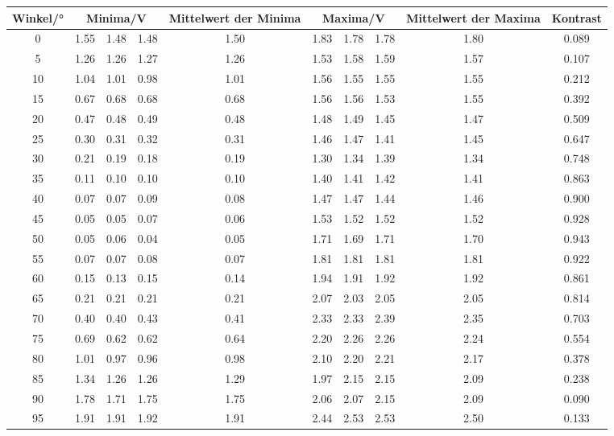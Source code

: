 \begin{sidewaystable}
\begin{tabular}{c c c c c c c c c c}
    \toprule
        Winkel/°&\multicolumn{3}{c}{Minima/V}&Mittelwert der Minima&\multicolumn{3}{c}{Maxima/V}&Mittelwert der Maxima&Kontrast \\
    \midrule
      0& 1.55 & 1.48 & 1.48 & 1.50 & 1.83 & 1.78 & 1.78 & 1.80 & 0.089 \\
      5& 1.26 & 1.26 & 1.27 & 1.26 & 1.53 & 1.58 & 1.59 & 1.57 & 0.107 \\
     10& 1.04 & 1.01 & 0.98 & 1.01 & 1.56 & 1.55 & 1.55 & 1.55 & 0.212 \\
     15& 0.67 & 0.68 & 0.68 & 0.68 & 1.56 & 1.56 & 1.53 & 1.55 & 0.392 \\
     20& 0.47 & 0.48 & 0.49 & 0.48 & 1.48 & 1.49 & 1.45 & 1.47 & 0.509 \\
     25& 0.30 & 0.31 & 0.32 & 0.31 & 1.46 & 1.47 & 1.41 & 1.45 & 0.647 \\
     30& 0.21 & 0.19 & 0.18 & 0.19 & 1.30 & 1.34 & 1.39 & 1.34 & 0.748 \\
     35& 0.11 & 0.10 & 0.10 & 0.10 & 1.40 & 1.41 & 1.42 & 1.41 & 0.863 \\
     40& 0.07 & 0.07 & 0.09 & 0.08 & 1.47 & 1.47 & 1.44 & 1.46 & 0.900 \\
     45& 0.05 & 0.05 & 0.07 & 0.06 & 1.53 & 1.52 & 1.52 & 1.52 & 0.928 \\
     50& 0.05 & 0.06 & 0.04 & 0.05 & 1.71 & 1.69 & 1.71 & 1.70 & 0.943 \\
     55& 0.07 & 0.07 & 0.08 & 0.07 & 1.81 & 1.81 & 1.81 & 1.81 & 0.922 \\
     60& 0.15 & 0.13 & 0.15 & 0.14 & 1.94 & 1.91 & 1.92 & 1.92 & 0.861 \\
     65& 0.21 & 0.21 & 0.21 & 0.21 & 2.07 & 2.03 & 2.05 & 2.05 & 0.814 \\
     70& 0.40 & 0.40 & 0.43 & 0.41 & 2.33 & 2.33 & 2.39 & 2.35 & 0.703 \\
     75& 0.69 & 0.62 & 0.62 & 0.64 & 2.20 & 2.26 & 2.26 & 2.24 & 0.554 \\
     80& 1.01 & 0.97 & 0.96 & 0.98 & 2.10 & 2.20 & 2.21 & 2.17 & 0.378 \\
     85& 1.34 & 1.26 & 1.26 & 1.29 & 1.97 & 2.15 & 2.15 & 2.09 & 0.238 \\
     90& 1.78 & 1.71 & 1.75 & 1.75 & 2.06 & 2.07 & 2.15 & 2.09 & 0.090 \\
     95& 1.91 & 1.91 & 1.92 & 1.91 & 2.44 & 2.53 & 2.53 & 2.50 & 0.133 \\

\end{tabular}
\end{sidewaystable}
